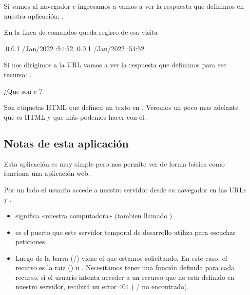 \documentclass[a5paper,9pt,spanish]{sphinxmanual}
\begin{document}
\sphinxAtStartPar
Si vamos al navegador e ingresamos a 
vamos a ver la respuesta que definimos en nuestra aplicación:
.

\sphinxAtStartPar
En la linea de comandos queda regisro de esa visita

\begin{sphinxVerbatim}[commandchars=\\\{\}]
.0.0.1 \PYGZhy{} \PYGZhy{} \PYG{o}{[}/Jan/2022 :54:52\PYG{o}{]}   \PYGZhy{}
.0.0.1 \PYGZhy{} \PYGZhy{} \PYG{o}{[}/Jan/2022 :54:52\PYG{o}{]}   \PYGZhy{}
\end{sphinxVerbatim}

\sphinxAtStartPar
Si nos dirigimos a la URL  vamos a ver
la respuesta que definimos para ese recurso: .

\sphinxAtStartPar
¿Que son  e ?

\sphinxAtStartPar
Son etiquetas HTML que definen un texto en .
Veremos un poco mas adelante que es HTML y que más podemos hacer con él.


\subsection{Notas de esta aplicación}
\label{\detokenize{flask:notas-de-esta-aplicacion}}
\sphinxAtStartPar
Esta aplicación es muy simple pero nos permite ver de forma básica
como funciona una aplicación web.

\sphinxAtStartPar
Por un lado el usuario accede a nuestro servidor desde su navegador
en las URLs  y .
\begin{itemize}
\item {} 
\sphinxAtStartPar
{} significa «nuestra computadora» (tambien llamado )

\item {} 
\sphinxAtStartPar
{} es el puerto que este servidor temporal de desarrollo
utiliza para escuchar peticiones.

\item {} 
\sphinxAtStartPar
Luego de la barra (/) viene el  que estamos solicitando.
En este caso, el recurso es la raiz (\sphinxcode{\sphinxupquote{/}}) u .
Necesitamos tener una función definida para cada recurso, si
el usuario intenta acceder a un recurso que no esta definido
en nuestro servidor, recibirá un error 404 ( / no encontrado).

\end{itemize}
\end{document}
